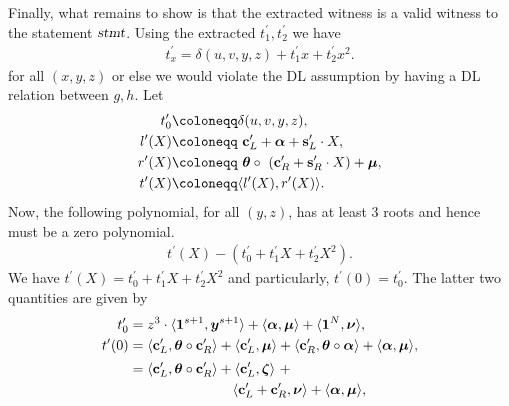   Finally, what remains to show is that the extracted witness is a valid witness to the statement $\textsl{stmt}$. Using the extracted $t_1^{\prime}, t_2^{\prime}$ we have
  \begin{gather*}
      t_{x}^{\prime} = \delta(u,v,y, z) + t_1^{\prime}x + t_2^{\prime}x^2.
  \end{gather*}
  for all $(x,y,z)$ or else we would violate the DL assumption by having a DL relation between $g,h$. Let
  \begin{align*}
      t_0^{\prime} &\coloneqq \delta(u,v,y, z), \\
      l^{\prime}(X) &\coloneqq \ \textbf{c}_L^{\prime} + \vecnb{\alpha} + \textbf{s}_L^{\prime} \cdot X ,
      \\
      r^{\prime}(X) &\coloneqq \ \vecnb{\theta} \circ \ (\textbf{c}_R^{\prime} + \textbf{s}_R^{\prime} \cdot X) + \vecnb{\mu},
      \\
      t^{\prime}(X) &\coloneqq \langle l^{\prime}(X),r^{\prime}(X) \rangle.
  \end{align*}
  Now, the following polynomial, for all $(y,z)$, has at least 3 roots and hence must be a zero polynomial.
  \begin{align*}
      t^{\prime}(X) - (t_0^{\prime} + t_1^{\prime}X + t_2^{\prime}X^2).
  \end{align*}
  We have $t^{\prime}(X) = t_0^{\prime} + t_1^{\prime}X + t_2^{\prime}X^2 $ and particularly, $t^{\prime}(0) = t_0^{\prime}$. The latter two quantities are given by 
  \begin{align}
      t_0^{\prime} &= z^3 \cdot \langle {\boldsymbol{1}}^{s+1}, {\boldsymbol{y}}^{s+1} \rangle + \langle {\boldsymbol{\alpha}}, {\boldsymbol{\mu}} \rangle + \langle {\boldsymbol{1}}^N, {\boldsymbol{\nu}}\rangle, \label{label:t0}\\
      t^{\prime}(0) &= 
      \langle \textbf{c}_L^{\prime}, {\boldsymbol{\theta}} \circ \textbf{c}_R^{\prime} \rangle + 
      \langle \textbf{c}_L^{\prime}, {\boldsymbol{\mu}} \rangle
      +
      \langle \textbf{c}_R^{\prime}, {\boldsymbol{\theta}} \circ {\boldsymbol{\alpha}} \rangle
      +
      \langle {\boldsymbol{\alpha}}, {\boldsymbol{\mu}} \rangle, \nonumber \\[2pt]
      &=
      \langle \textbf{c}_L^{\prime}, {\boldsymbol{\theta}} \circ \textbf{c}_R^{\prime} \rangle + 
      \langle \textbf{c}_L^{\prime}, {\boldsymbol{\zeta}} \rangle \ +
      \nonumber
      \\
      &
      \hspace{2.62cm}
      \langle \textbf{c}_L^{\prime}+\textbf{c}_R^{\prime}, {\boldsymbol{\nu}} \rangle
      +
      \langle {\boldsymbol{\alpha}}, {\boldsymbol{\mu}} \rangle, \label{label:tX0}
  \end{align}
